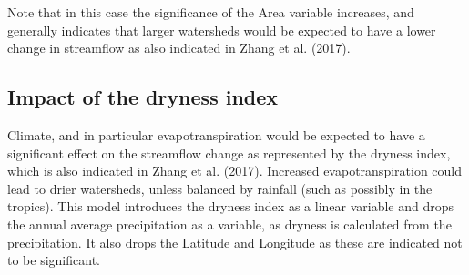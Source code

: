 \documentclass[]{elsarticle} %
\begin{document}
Note that in this case the significance of the Area variable increases,
and generally indicates that larger watersheds would be expected to have
a lower change in streamflow as also indicated in Zhang et al. (2017).

\hypertarget{impact-of-the-dryness-index}{%
\subsection{Impact of the dryness
index}\label{impact-of-the-dryness-index}}

Climate, and in particular evapotranspiration would be expected to have
a significant effect on the streamflow change as represented by the
dryness index, which is also indicated in Zhang et al. (2017). Increased
evapotranspiration could lead to drier watersheds, unless balanced by
rainfall (such as possibly in the tropics). This model introduces the
dryness index as a linear variable and drops the annual average
precipitation as a variable, as dryness is calculated from the
precipitation. It also drops the Latitude and Longitude as these are
indicated not to be significant.
\end{document}
